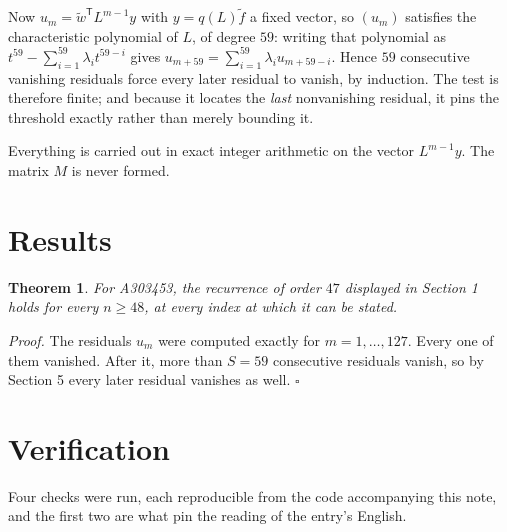 \documentclass[11pt]{article}
\newtheorem{theorem}{Theorem}
\theoremstyle{definition}
\begin{document}
Now $u_m = \tilde w^{\mathsf T} L^{m-1} y$ with $y = q(L)\tilde f$ a fixed vector, so $(u_m)$ satisfies the characteristic polynomial of $L$, of degree $59$: writing that polynomial as $t^{59} - \sum_{i=1}^{59} \lambda_i t^{59-i}$ gives $u_{m+59} = \sum_{i=1}^{59} \lambda_i u_{m+59-i}$. Hence $59$ consecutive vanishing residuals force every later residual to vanish, by induction. The test is therefore finite; and because it locates the {\itshape last} nonvanishing residual, it pins the threshold exactly rather than merely bounding it.

Everything is carried out in exact integer arithmetic on the vector $L^{m-1}y$. The matrix $M$ is never formed.

\section{Results}

\begin{theorem} For A303453, the recurrence of order $47$ displayed in Section 1 holds for every $n \ge 48$, at every index at which it can be stated.\end{theorem}

{\itshape Proof.} The residuals $u_m$ were computed exactly for $m = 1,\dots,127$. Every one of them vanished. After it, more than $S = 59$ consecutive residuals vanish, so by Section 5 every later residual vanishes as well. $\square$

\section{Verification}

Four checks were run, each reproducible from the code accompanying this note, and the first two are what pin the reading of the entry's English.
\end{document}
